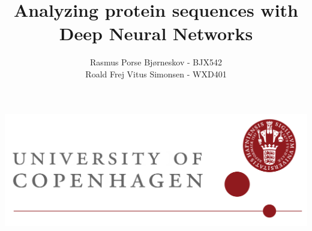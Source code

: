 \documentclass[12pt,a4paper]{article} %
\author{Rasmus Porse Bjørneskov - BJX542\\Roald Frej Vitus Simonsen - WXD401}
\title{Analyzing protein sequences with Deep Neural Networks}
\begin{document}
\maketitle
\begin{center}
\includegraphics[width=0.6\linewidth]{images/ku_logo_uk_h}
\end{center}

\newpage
\setcounter{tocdepth}{2}
\tableofcontents
\newpage
\begin{multicols}{2}




\end{multicols}
\newpage
\nocite{*}
 

\newpage

\end{document}
